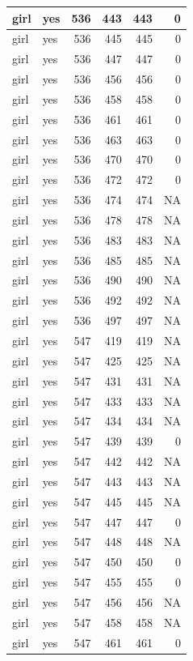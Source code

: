 \documentclass[man]{apa6}
\begin{document}
\begin{tabular}{l|l|r|r|r|r}
\hline
girl & yes & 536 & 443 & 443 & 0\\
\hline
girl & yes & 536 & 445 & 445 & 0\\
\hline
girl & yes & 536 & 447 & 447 & 0\\
\hline
girl & yes & 536 & 456 & 456 & 0\\
\hline
girl & yes & 536 & 458 & 458 & 0\\
\hline
girl & yes & 536 & 461 & 461 & 0\\
\hline
girl & yes & 536 & 463 & 463 & 0\\
\hline
girl & yes & 536 & 470 & 470 & 0\\
\hline
girl & yes & 536 & 472 & 472 & 0\\
\hline
girl & yes & 536 & 474 & 474 & NA\\
\hline
girl & yes & 536 & 478 & 478 & NA\\
\hline
girl & yes & 536 & 483 & 483 & NA\\
\hline
girl & yes & 536 & 485 & 485 & NA\\
\hline
girl & yes & 536 & 490 & 490 & NA\\
\hline
girl & yes & 536 & 492 & 492 & NA\\
\hline
girl & yes & 536 & 497 & 497 & NA\\
\hline
girl & yes & 547 & 419 & 419 & NA\\
\hline
girl & yes & 547 & 425 & 425 & NA\\
\hline
girl & yes & 547 & 431 & 431 & NA\\
\hline
girl & yes & 547 & 433 & 433 & NA\\
\hline
girl & yes & 547 & 434 & 434 & NA\\
\hline
girl & yes & 547 & 439 & 439 & 0\\
\hline
girl & yes & 547 & 442 & 442 & NA\\
\hline
girl & yes & 547 & 443 & 443 & NA\\
\hline
girl & yes & 547 & 445 & 445 & NA\\
\hline
girl & yes & 547 & 447 & 447 & 0\\
\hline
girl & yes & 547 & 448 & 448 & NA\\
\hline
girl & yes & 547 & 450 & 450 & 0\\
\hline
girl & yes & 547 & 455 & 455 & 0\\
\hline
girl & yes & 547 & 456 & 456 & NA\\
\hline
girl & yes & 547 & 458 & 458 & NA\\
\hline
girl & yes & 547 & 461 & 461 & 0\\

\end{tabular}
\end{document}
